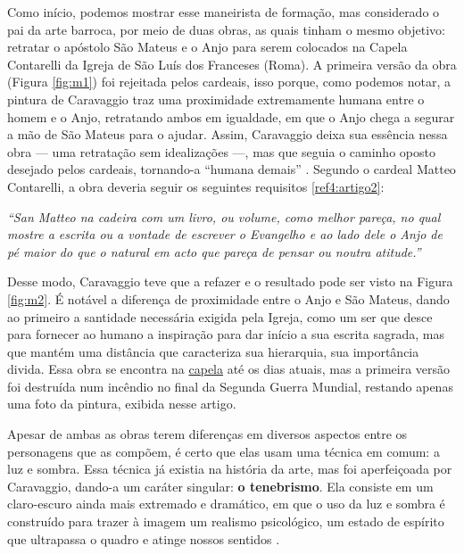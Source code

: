 \begin{multicols}{2}
Como início, podemos mostrar esse maneirista de formação, mas considerado o pai da arte barroca, por meio de duas obras, as quais  tinham o mesmo objetivo: retratar o apóstolo São Mateus e o Anjo para serem colocados na Capela Contarelli da Igreja de São Luís dos Franceses (Roma). A primeira versão da obra (Figura \ref{fig:m1}) foi rejeitada pelos cardeais, isso porque, como podemos notar, a pintura de Caravaggio traz uma proximidade extremamente humana entre o homem e o Anjo, retratando ambos em igualdade, em que o Anjo chega a segurar a mão de São Mateus para o ajudar. Assim, Caravaggio deixa sua essência nessa obra — uma retratação sem idealizações —, mas que seguia o caminho oposto desejado pelos cardeais, tornando-a ``humana demais''  . Segundo o cardeal Matteo Contarelli, a obra deveria seguir os seguintes requisitos \ref{ref4:artigo2}: 

\textit{``San Matteo na cadeira com um livro, ou volume, como melhor pareça, no qual mostre a escrita ou a vontade de escrever o Evangelho e ao lado dele o Anjo de pé maior do que o natural em acto que pareça de pensar ou noutra atitude.''}

Desse modo, Caravaggio teve que a refazer e o resultado pode ser visto na Figura \ref{fig:m2}. É notável a diferença de proximidade entre o Anjo e São Mateus, dando ao primeiro a santidade necessária exigida pela Igreja, como um ser que desce para fornecer ao humano a inspiração para dar início a sua escrita sagrada, mas que mantém uma distância que caracteriza sua hierarquia, sua importância divida. Essa obra se encontra na \href{https://commons.wikimedia.org/wiki/File:1475RomaSLuigiFrancesiInside.jpg}{capela} até os dias atuais, mas a primeira versão foi destruída num incêndio no final da Segunda Guerra Mundial, restando apenas uma foto da pintura, exibida nesse artigo.

Apesar de ambas as obras terem diferenças em diversos aspectos entre os personagens que as compõem, é certo que elas usam uma técnica em comum: a luz e sombra. Essa técnica já existia na história da arte, mas foi aperfeiçoada por Caravaggio, dando-a um caráter singular: \textbf{o tenebrismo}. Ela consiste em um claro-escuro ainda mais extremado e dramático, em que o uso da luz e sombra é construído para trazer à imagem um realismo psicológico, um estado de espírito que ultrapassa o quadro e atinge nossos sentidos .


\end{multicols}
